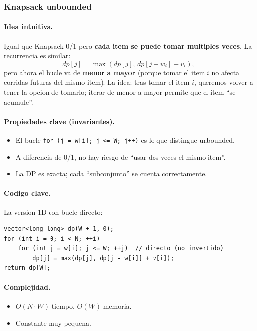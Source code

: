 ﻿\subsubsection{Knapsack unbounded}

\paragraph{Idea intuitiva.}
Igual que Knapsack 0/1 pero \textbf{cada item se puede tomar multiples veces}. La recurrencia es similar:
\[ dp[j] = \max(dp[j],\, dp[j - w_i] + v_i), \]
pero ahora el bucle va de \textbf{menor a mayor} (porque tomar el item $i$ no afecta corridas futuras del mismo item). La idea: tras tomar el item $i$, queremos volver a tener la opcion de tomarlo; iterar de menor a mayor permite que el item ``se acumule''.

\paragraph{Propiedades clave (invariantes).}
\begin{itemize}\setlength\itemsep{0pt}
	\item El bucle \texttt{for (j = w[i]; j <= W; j++)} es lo que distingue unbounded.
	\item A diferencia de 0/1, no hay riesgo de ``usar dos veces el mismo item''.
	\item La DP es exacta; cada ``subconjunto'' se cuenta correctamente.
\end{itemize}

\paragraph{Codigo clave.}
La version 1D con bucle directo:
\begin{verbatim}
vector<long long> dp(W + 1, 0);
for (int i = 0; i < N; ++i)
    for (int j = w[i]; j <= W; ++j)  // directo (no invertido)
        dp[j] = max(dp[j], dp[j - w[i]] + v[i]);
return dp[W];
\end{verbatim}

\paragraph{Complejidad.}
\begin{itemize}\setlength\itemsep{0pt}
	\item $O(N \cdot W)$ tiempo, $O(W)$ memoria.
	\item Constante muy pequena.
\end{itemize}

